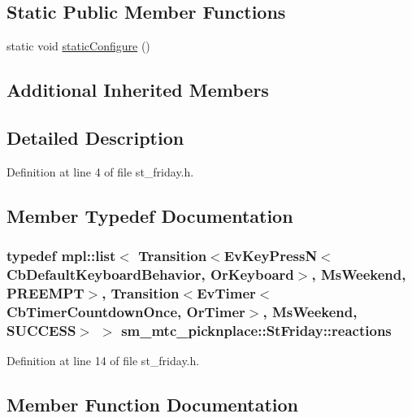\subsection*{Static Public Member Functions}
\begin{DoxyCompactItemize}
\item 
static void \hyperlink{structsm__mtc__picknplace_1_1StFriday_a9a3dd567637f7762b0f081b21f0ede03}{static\+Configure} ()
\end{DoxyCompactItemize}
\subsection*{Additional Inherited Members}


\subsection{Detailed Description}


Definition at line 4 of file st\+\_\+friday.\+h.



\subsection{Member Typedef Documentation}
\subsubsection[{\texorpdfstring{reactions}{reactions}}]{\setlength{\rightskip}{0pt plus 5cm}typedef mpl\+::list$<$ Transition$<$Ev\+Key\+PressN$<$Cb\+Default\+Keyboard\+Behavior, {\bf Or\+Keyboard}$>$, {\bf Ms\+Weekend}, {\bf P\+R\+E\+E\+M\+PT}$>$, Transition$<$Ev\+Timer$<$Cb\+Timer\+Countdown\+Once, {\bf Or\+Timer}$>$, {\bf Ms\+Weekend}, {\bf S\+U\+C\+C\+E\+SS}$>$ $>$ {\bf sm\+\_\+mtc\+\_\+picknplace\+::\+St\+Friday\+::reactions}}\hypertarget{structsm__mtc__picknplace_1_1StFriday_a36ad8453803378c192bc8f3fa0cf2fad}{}\label{structsm__mtc__picknplace_1_1StFriday_a36ad8453803378c192bc8f3fa0cf2fad}


Definition at line 14 of file st\+\_\+friday.\+h.



\subsection{Member Function Documentation}
